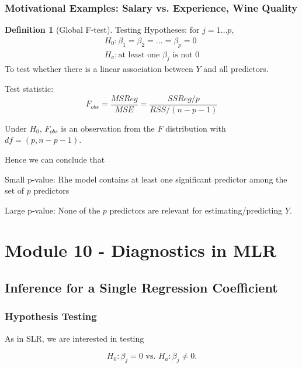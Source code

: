 \documentclass[11pt]{article}
\newenvironment{indentone}{\begin{adjustwidth}{3em}{0em}}{\end{adjustwidth}}
\theoremstyle{definition}
\newtheorem{definition}{Definition}[section]
\numberwithin{equation}{section}
\begin{document}
\subsubsection{Motivational Examples: Salary vs. Experience, Wine Quality}
\begin{definition}[Global F-test]
  Testing Hypotheses: for $j=1\dots p$,
  \begin{gather}
    H_0: \beta_1=\beta_2=\dots=\beta_p=0\\
    H_a: \text{at least one } \beta_j \text{ is not } 0
  \end{gather}
  To test whether there is a linear association between $Y$ and all predictors.

  Test statistic:
  \begin{equation}
    F_{obs} = \frac{MSReg}{MSE}=\frac{SSReg/p}{RSS/(n-p-1)}
  \end{equation}

  Under $H_0$, $F_{obs}$ is an observation from the $F$ distribution with $df=(p,n-p-1)$.

  Hence we can conclude that
  \begin{indentone}
    Small p-value: Rhe model contains at least one significant predictor among the set of $p$ predictors

    Large p-value: None of the $p$ predictors are relevant for estimating/predicting $Y$.
  \end{indentone}
\end{definition}




\newpage

\section{Module 10 - Diagnostics in MLR}

\subsection{Inference for a Single Regression Coefficient}

\subsubsection{Hypothesis Testing}

As in SLR, we are interested in testing

\begin{equation}
  H_0: \beta_j = 0\text{ vs. }H_a: \beta_j\neq 0.
\end{equation}
\end{document}
